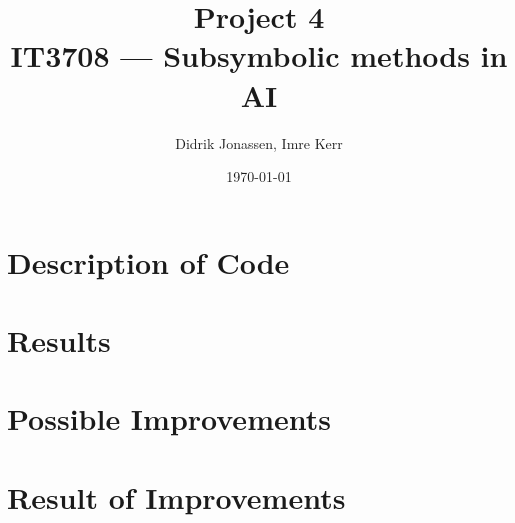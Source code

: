 \documentclass[a4paper,12pt]{article}
\author{Didrik Jonassen, Imre Kerr\vspace{-2ex}}
\title{\vspace{-5ex}Project 4\\ IT3708 --- Subsymbolic methods in AI}
\date{\today}
\begin{document}
\maketitle

\section{Description of Code}

\section{Results}

\section{Possible Improvements}

\section{Result of Improvements}
\end{document}
